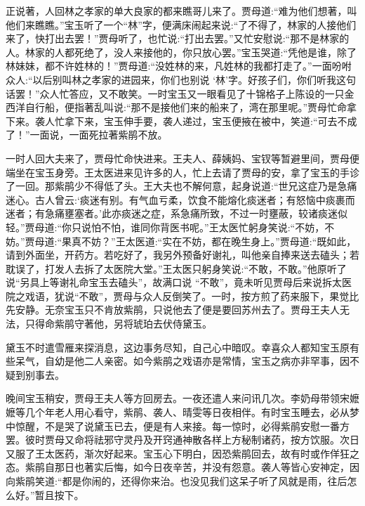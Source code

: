 \begin{parag}
    正说著，人回林之孝家的单大良家的都来瞧哥儿来了。贾母道:“难为他们想著，叫他们来瞧瞧。”宝玉听了一个“林”字，便满床闹起来说:“了不得了，林家的人接他们来了，快打出去罢！”贾母听了，也忙说:“打出去罢。”又忙安慰说:“那不是林家的人。林家的人都死绝了，没人来接他的，你只放心罢。”宝玉哭道:“凭他是谁，除了林妹妹，都不许姓林的！”贾母道:“没姓林的来，凡姓林的我都打走了。”一面吩咐众人:“以后别叫林之孝家的进园来，你们也别说 ‘林’字。好孩子们，你们听我这句话罢！”众人忙答应，又不敢笑。一时宝玉又一眼看见了十锦格子上陈设的一只金西洋自行船，便指著乱叫说:“那不是接他们来的船来了，湾在那里呢。”贾母忙命拿下来。袭人忙拿下来，宝玉伸手要，袭人递过，宝玉便掖在被中，笑道:“可去不成了！”一面说，一面死拉著紫鹃不放。
\end{parag}


\begin{parag}
    一时人回大夫来了，贾母忙命快进来。王夫人、薛姨妈、宝钗等暂避里间，贾母便端坐在宝玉身旁。王太医进来见许多的人，忙上去请了贾母的安，拿了宝玉的手诊了一回。那紫鹃少不得低了头。王大夫也不解何意，起身说道:“世兄这症乃是急痛迷心。古人曾云:‘痰迷有别。有气血亏柔，饮食不能熔化痰迷者；有怒恼中痰裹而迷者；有急痛壅塞者。’此亦痰迷之症，系急痛所致，不过一时壅蔽，较诸痰迷似轻。”贾母道:“你只说怕不怕，谁同你背医书呢。”王太医忙躬身笑说:“不妨，不妨。”贾母道:“果真不妨？”王太医道:“实在不妨，都在晚生身上。”贾母道:“既如此，请到外面坐，开药方。若吃好了，我另外预备好谢礼，叫他亲自捧来送去磕头；若耽误了，打发人去拆了太医院大堂。”王太医只躬身笑说:“不敢，不敢。”他原听了说“另具上等谢礼命宝玉去磕头”，故满口说 “不敢”，竟未听见贾母后来说拆太医院之戏语，犹说“不敢”，贾母与众人反倒笑了。一时，按方煎了药来服下，果觉比先安静。无奈宝玉只不肯放紫鹃，只说他去了便是要回苏州去了。贾母王夫人无法，只得命紫鹃守著他，另将琥珀去伏侍黛玉。
\end{parag}


\begin{parag}
    黛玉不时遣雪雁来探消息，这边事务尽知，自己心中暗叹。幸喜众人都知宝玉原有些呆气，自幼是他二人亲密。如今紫鹃之戏语亦是常情，宝玉之病亦非罕事，因不疑到别事去。
\end{parag}


\begin{parag}
    晚间宝玉稍安，贾母王夫人等方回房去。一夜还遣人来问讯几次。李奶母带领宋嬷嬷等几个年老人用心看守，紫鹃、袭人、晴雯等日夜相伴。有时宝玉睡去，必从梦中惊醒，不是哭了说黛玉已去，便是有人来接。每一惊时，必得紫鹃安慰一番方罢。彼时贾母又命将祛邪守灵丹及开窍通神散各样上方秘制诸药，按方饮服。次日又服了王太医药，渐次好起来。宝玉心下明白，因恐紫鹃回去，故有时或作佯狂之态。紫鹃自那日也著实后悔，如今日夜辛苦，并没有怨意。袭人等皆心安神定，因向紫鹃笑道:“都是你闹的，还得你来治。也没见我们这呆子听了风就是雨，往后怎么好。”暂且按下。
\end{parag}


